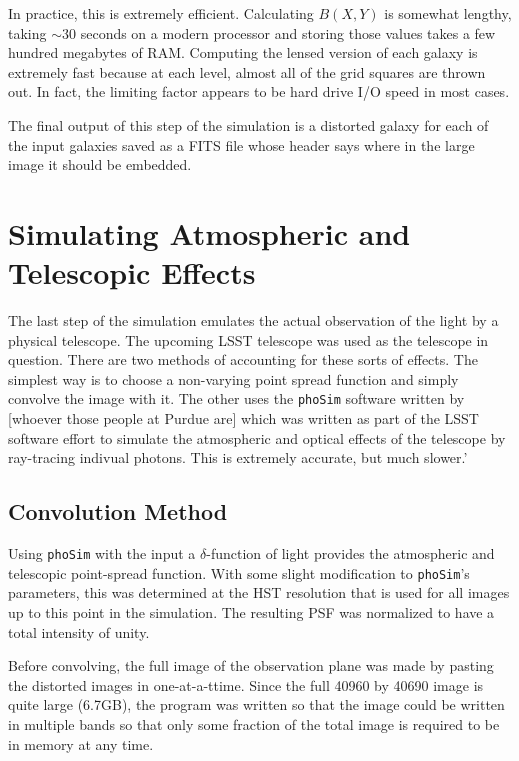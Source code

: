 \documentclass[10pt,twoside]{article}
\theoremstyle{definition}
\theoremstyle{exercise}
\begin{document}
In practice, this is extremely efficient. Calculating $B(X,Y)$ is somewhat lengthy, taking $\sim$30 seconds on a modern processor and storing those values takes a few hundred megabytes of RAM. Computing the lensed version of each galaxy is extremely fast because at each level, almost all of the grid squares are thrown out. In fact, the limiting factor appears to be hard drive I/O speed in most cases.

The final output of this step of the simulation is a distorted galaxy for each of the input galaxies saved as a FITS file whose header says where in the large image it should be embedded.

\section{Simulating Atmospheric and Telescopic Effects}
The last step of the simulation emulates the actual observation of the light by a physical telescope. The upcoming LSST telescope was used as the telescope in question. There are two methods of accounting for these sorts of effects. The simplest way is to choose a non-varying point spread function and simply convolve the image with it. The other uses the \texttt{phoSim} software written by [whoever those people at Purdue are] which was written as part of the LSST software effort to simulate the atmospheric and optical effects of the telescope by ray-tracing indivual photons. This is extremely accurate, but much slower.'

\subsection{Convolution Method}
Using \texttt{phoSim} with the input a $\delta$-function of light provides the atmospheric and telescopic point-spread function. With some slight modification to \texttt{phoSim}'s parameters, this was determined at the HST resolution that is used for all images up to this point in the simulation. The resulting PSF was normalized to have a total intensity of unity.

Before convolving, the full image of the observation plane was made by pasting the distorted images in one-at-a-ttime. Since the full 40960 by 40690 image is quite large (6.7GB), the program was written so that the image could be written in multiple bands so that only some fraction of the total image is required to be in memory at any time.
\end{document}

